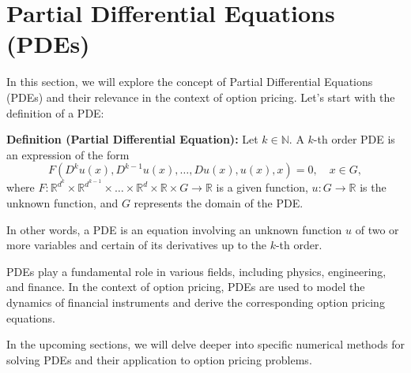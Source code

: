 \section{Partial Differential Equations (PDEs)}

In this section, we will explore the concept of Partial Differential Equations (PDEs) and their relevance in the context of option pricing. Let's start with the definition of a PDE:

\textbf{Definition (Partial Differential Equation):}
Let $k \in \mathbb{N}$. A $k$-th order PDE is an expression of the form
\[F(D^k u(x), D^{k-1} u(x), \ldots, Du(x), u(x), x) = 0, \quad x \in G,\]
where $F : \mathbb{R}^{d^k} \times \mathbb{R}^{d^{k-1}} \times \ldots \times \mathbb{R}^d \times \mathbb{R} \times G \rightarrow \mathbb{R}$ is a given function, $u : G \rightarrow \mathbb{R}$ is the unknown function, and $G$ represents the domain of the PDE.

In other words, a PDE is an equation involving an unknown function $u$ of two or more variables and certain of its derivatives up to the $k$-th order.

PDEs play a fundamental role in various fields, including physics, engineering, and finance. In the context of option pricing, PDEs are used to model the dynamics of financial instruments and derive the corresponding option pricing equations.

In the upcoming sections, we will delve deeper into specific numerical methods for solving PDEs and their application to option pricing problems.
